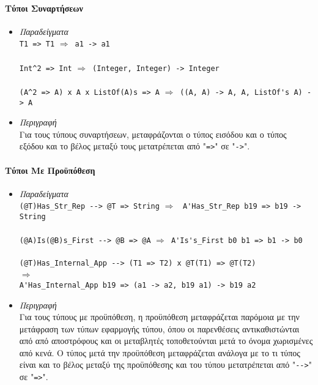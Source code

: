 \documentclass[diploma]{softlab-thesis}
\def\lra{$\Longrightarrow$\ }
\begin{document}
\newpage
\paragraph{Τύποι Συναρτήσεων}

\begin{itemize}
\item
\textit{Παραδείγματα}\\

\verb|T1 => T1| \lra \verb|a1 -> a1|\\\\
\verb|Int^2 => Int| \lra \verb|(Integer, Integer) -> Integer|\\\\
\verb|(A^2 => A) x A x ListOf(A)s => A|
\lra \verb|((A, A) -> A, A, ListOf's A) -> A|\\

\item
\textit{Περιγραφή}\\

Για τους τύπους συναρτήσεων, μεταφράζονται ο τύπος εισόδου και ο τύπος εξόδου
και το βέλος μεταξύ τους μετατρέπεται από "\verb|=>|" σε "\verb|->|".

\end{itemize}

\paragraph{Τύποι Με Προϋπόθεση}

\begin{itemize}
\item
\textit{Παραδείγματα}\\

\verb|(@T)Has_Str_Rep --> @T => String|
\lra
\verb|A'Has_Str_Rep b19 => b19 -> String|\\\\
\verb|(@A)Is(@B)s_First --> @B => @A|
\lra \verb|A'Is's_First b0 b1 => b1 -> b0|\\\\
\verb|(@T)Has_Internal_App --> (T1 => T2) x @T(T1) => @T(T2)|
\\
\lra
\\
\verb|A'Has_Internal_App b19 => (a1 -> a2, b19 a1) -> b19 a2|\\

\item
\textit{Περιγραφή}\\

Για τους τύπους με προϋπόθεση, η προϋπόθεση μεταφράζεται παρόμοια με την
μετάφραση των τύπων εφαρμογής τύπου, όπου οι παρενθέσεις αντικαθιστώνται
από από αποστρόφους και οι μεταβλητές τοποθετούνται μετά το όνομα χωρισμένες
από κενά. Ο τύπος μετά την προϋπόθεση μεταφράζεται ανάλογα με το τι τύπος είναι
και το βέλος μεταξύ της προϋπόθεσης και του τύπου μετατρέπεται από "\verb|-->|"
σε "\verb|=>|".

\end{itemize}
\end{document}

